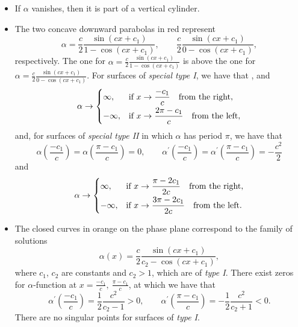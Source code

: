 \documentclass[10pt,a4paper]{amsart}
\numberwithin{equation}{section}
\begin{document}
\begin{itemize}\itemsep=0pt
\item If $\alpha$ vanishes, then it is part of a vertical cylinder.

\item The two concave downward parabolas in red represent
\[
\alpha=\frac{c}{2}\frac{\sin{(cx+c_1)}}{1-\cos{(cx+c_1)}},\qquad \frac{c}{2}\frac{\sin{(cx+c_1)}}{0-\cos{(cx+c_1)}},
\]
respectively. The one for $\alpha=\frac{c}{2}\frac{\sin{(cx+c_1)}}{1-\cos{(cx+c_1)}}$ is above the one for $\alpha=\frac{c}{2}\frac{\sin{(cx+c_1)}}{0-\cos{(cx+c_1)}}$. For
surfaces of \emph{special type I}, we have that
, 
and
\begin{equation*}
\alpha \rightarrow \begin{cases}
\infty, & \text{if}\ x\rightarrow\dfrac{-c_{1}}{c}\quad \text{from the right}, \vspace{1mm}\\
-\infty, & \text{if}\ x\rightarrow \dfrac{2\pi-c_1}{c} \quad \text{from the
left},
\end{cases}
\end{equation*}
and, for surfaces of \emph{special type II} in which $\alpha$ has period $\pi$, we have that
\[
\alpha\left(\frac{-c_{1}}{c}\right)=\alpha\left(\frac{\pi-c_1}{c}\right)=0,\qquad \alpha^{\prime
}\left(\frac{-c_{1}}{c}\right)=\alpha^{\prime }\left(\frac{\pi-c_1}{c}\right)=-\frac{c^2}{2}
\]
and
\begin{equation*}
\alpha \rightarrow \begin{cases}
\infty, & \text{if}\ x\rightarrow \dfrac{\pi-2c_1}{2c}\quad \text{from the
right}, \vspace{1mm}\\
-\infty, & \text{if}\ x\rightarrow \dfrac{3\pi-2c_1}{2c}\quad \text{from the
left}.
\end{cases}
\end{equation*}

\item The closed curves in orange on the phase plane correspond to the family of solutions
\[
\alpha(x)=\frac{c}{2}\frac{\sin{(cx+c_{1})}}{c_{2}-\cos{(cx+c_{1})}},
\]
where $c_1$, $c_2$ are constants and $c_2>1$, which are of \emph{type I}.
There exist zeros for $\alpha$-function at $x=\frac{-c_{1}}{c},\ \frac{\pi-c_1}{c}$,
at which we have that
\[
\alpha^{\prime }\left(\frac{-c_1}{c}\right)=\frac{1}{2}\frac{c^2}{c_{2}-1}>0,\qquad \alpha^{\prime
}\left(\frac{\pi-c_1}{c}\right)=-\frac{1}{2}\frac{c^2}{c_{2}+1}<0.
\]
There are no singular points for surfaces of \emph{type I}.


\end{itemize}
\end{document}
